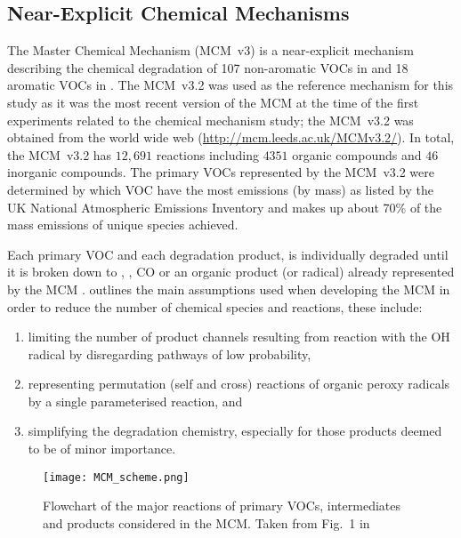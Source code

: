 \subsection{Near-Explicit Chemical Mechanisms} \label{ss:near_explicit}
The Master Chemical Mechanism (MCM~v3) is a near-explicit mechanism describing the chemical degradation of 107 non-aromatic VOCs in \citep{Saunders:2003} and 18 aromatic VOCs in \citep{Jenkin:2003}. 
The MCM~v3.2 was used as the reference mechanism for this study as it was the most recent version of the MCM at the time of the first experiments related to the chemical mechanism study; the MCM~v3.2 was obtained from the world wide web (\mbox{\url{http://mcm.leeds.ac.uk/MCMv3.2/}}).
In total, the MCM~v3.2 has $12,691$ reactions including $4351$ organic compounds and $46$ inorganic compounds. 
The primary VOCs represented by the MCM~v3.2 were determined by which VOC have the most emissions (by mass) as listed by the UK National Atmospheric Emissions Inventory and makes up about 70\% of the mass emissions of unique species achieved.

Each primary VOC and each degradation product, is individually degraded until it is broken down to , , CO or an organic product (or radical) already represented by the MCM \citep{Jenkin:1997}. 
\citet{Jenkin:1997} outlines the main assumptions used when developing the MCM in order to reduce the number of chemical species and reactions, these include:
\begin{enumerate}
    \item limiting the number of product channels resulting from reaction with the OH radical by disregarding pathways of low probability,
    \item representing permutation (self and cross) reactions of organic peroxy radicals by a single parameterised reaction, and
    \item simplifying the degradation chemistry, especially for those products deemed to be of minor importance.
\end{enumerate}

\begin{figure}
    \begin{center}
        \caption[Flowchart of VOC degradation represented by the MCM]{Flowchart of the major reactions of primary VOCs, intermediates and products considered in the MCM. Taken from Fig.~1 in \citet{Saunders:2003}}
        \texttt{[image: MCM\_scheme.png]}
        \label{f:MCM_scheme}
    \end{center}
\end{figure} 

